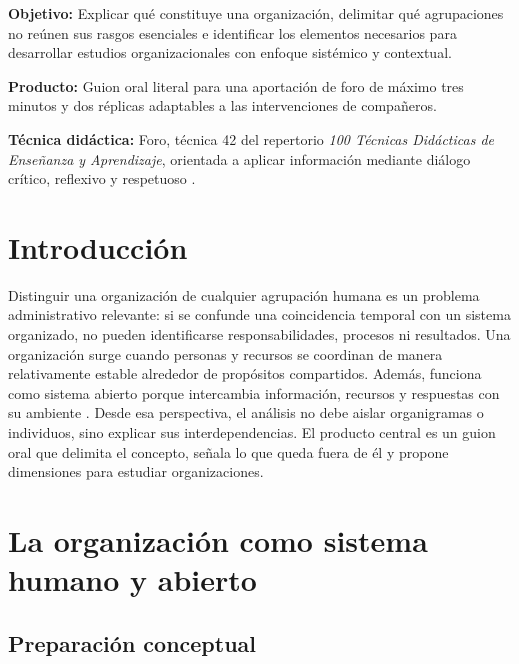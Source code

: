 \documentclass[spanish,letterpaper,oneside]{article}
\begin{document}
\templatePortrait
\templatePagecfg
\onehalfspacing

\begin{abstractd}
\textbf{Objetivo:} Explicar qué constituye una organización, delimitar qué agrupaciones no reúnen sus rasgos esenciales e identificar los elementos necesarios para desarrollar estudios organizacionales con enfoque sistémico y contextual.

\textbf{Producto:} Guion oral literal para una aportación de foro de máximo tres minutos y dos réplicas adaptables a las intervenciones de compañeros.

\textbf{Técnica didáctica:} Foro, técnica 42 del repertorio \textit{100 Técnicas Didácticas de Enseñanza y Aprendizaje}, orientada a aplicar información mediante diálogo crítico, reflexivo y respetuoso \citep{lopezForo2022}.
\end{abstractd}

\templateIndex
\templateFinalcfg

\section{Introducción}

Distinguir una organización de cualquier agrupación humana es un problema administrativo relevante: si se confunde una coincidencia temporal con un sistema organizado, no pueden identificarse responsabilidades, procesos ni resultados. Una organización surge cuando personas y recursos se coordinan de manera relativamente estable alrededor de propósitos compartidos. Además, funciona como sistema abierto porque intercambia información, recursos y respuestas con su ambiente \citep{kastRosenzweig1972,kastRosenzweig1985}. Desde esa perspectiva, el análisis no debe aislar organigramas o individuos, sino explicar sus interdependencias. El producto central es un guion oral que delimita el concepto, señala lo que queda fuera de él y propone dimensiones para estudiar organizaciones.

\section{La organización como sistema humano y abierto}

\subsection{Preparación conceptual}
\end{document}
